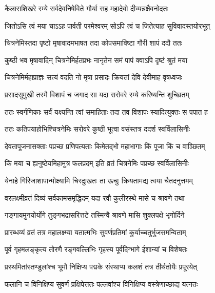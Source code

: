 

\twolineshloka
{कैलासशिखरे रम्ये सर्वदेवनिषेविते}
{गौर्या सह महादेवो दीव्यन्नक्षैवनोदतः}%


\twolineshloka
{जितोऽसि त्वं मया चाऽऽह पार्वती परमेश्वरम्}
{सोऽपि त्वं च जितेत्याह सुविवादस्तयोरभूत्}%


\twolineshloka
{चित्रनेमिस्तदा पृष्टो मृषावादमभाषत}
{तदा कोपसमाविष्टा गौरी शापं ददौ ततः}%


\twolineshloka
{कुष्ठी भव मृषावादिन् चित्रनेमिर्हतप्रभः}
{नानृतेन समं पापं क्वाऽपि दृष्टं श्रुतं मया}%


\twolineshloka
{चित्रनेमिर्महाप्राज्ञः सत्यं वदति नो मृषा}
{प्रसादः क्रियतां देवि देवीमाह वृषध्वजः}%


\twolineshloka
{प्रसादसुमुखी तस्मै विशापं च जगाद सा}
{यदा सरोवरे रम्ये करिष्यन्ति शुचिव्रतम्}%


\twolineshloka
{ततः स्वर्गणिकाः सर्वं यक्ष्यन्ति त्वां समाहिताः}
{तदा तव विशापः स्यादित्युक्तः स पपात ह}%


\twolineshloka
{ततः कतिपयाहोभिश्चित्रनेमिः सरोवरे}
{कुष्ठी भूत्वा वसंस्तत्र ददर्श स्वर्विलासिनीः}%


\twolineshloka
{देवतापूजनासक्ताः पप्रच्छ प्रणिपत्यताः}
{किमेतद्भो महाभागाः किं पूजा किं च वाञ्छितम्}%


\twolineshloka
{किं मया च ह्यनुष्ठेयमिहामुत्र फलप्रदम्}
{इति व्रतं चित्रनेमिः पप्रच्छ स्वर्विलासिनीः}%


\twolineshloka
{येनाहे गिरिजाशापान्मोक्ष्यामि चिरदुःखतः}
{ता ऊचुः क्रियतामद्य त्वया चैतदनुत्तमम्}%


\twolineshloka
{वरलक्ष्मीव्रतं दिव्यं सर्वकामसमृद्धिदम्}
{यदा रवौ कुलीरस्थे मासे च श्रावणे तथा}%


\twolineshloka
{गङ्गायमुनयोर्योगे तुङ्गभद्रासरित्तटे}
{तस्मिन्वै श्रावणे मासि शुक्लपक्षे भृगोर्दिने}%


\twolineshloka
{प्रारब्धव्यं व्रतं तत्र महालक्ष्म्या यतात्मभिः}
{सुवर्णप्रतिमां कुर्याच्चतुर्भुजसमन्विताम्}%


\twolineshloka
{पूर्व गृहमलङ्कृत्य तोरणै रङ्गवल्लिभिः}
{गृहस्य पूर्वदिग्भागे ईशान्यां च विशेषतः}%


\twolineshloka
{प्रस्थमितांस्तण्डुलांश्च भूमौ निक्षिप्य पद्मके}
{संस्थाप्य कलशं तत्र तीर्थतोयैः प्रपूरयेत्}%


\twolineshloka
{फलानि च विनिक्षिप्य सुवर्णं प्रक्षिपेत्ततः}
{पल्लवांश्च विनिक्षिप्य वस्त्रेणाच्छाद्य यत्नतः}%


